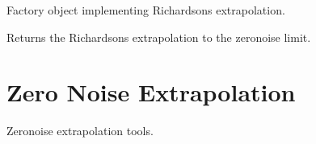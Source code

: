 \documentclass[letterpaper,10pt,english]{sphinxmanual}
\begin{document}
\begin{fulllineitems}
\label{\detokenize{apidoc:mitiq.factories.RichardsonFactory}}
Factory object implementing Richardson\textquotesingle{}s extrapolation.

\begin{fulllineitems}
\label{\detokenize{apidoc:mitiq.factories.RichardsonFactory.reduce}}
Returns the Richardson\textquotesingle{}s extrapolation to the zero\sphinxhyphen{}noise limit.

\end{fulllineitems}


\end{fulllineitems}



\section{Zero Noise Extrapolation}
\label{\detokenize{apidoc:module-mitiq.zne}}\label{\detokenize{apidoc:zero-noise-extrapolation}}
Zero\sphinxhyphen{}noise extrapolation tools.
\end{document}
